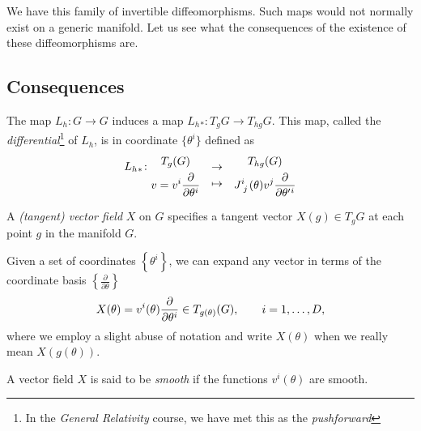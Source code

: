 We have this family of invertible diffeomorphisms. Such maps would not normally exist on a generic manifold. Let us see what the consequences of the existence of these diffeomorphisms are.

\subsection{Consequences}%
\label{sub:consequences}

\begin{wrapfigure}{R}{0.35\columnwidth}
  \centering
  \def\svgwidth{0.3\columnwidth}
  
  \label{fig:l8f2}
\end{wrapfigure}

The map $L_h \colon G \to G$ induces a map $L_h{}_*: T_g G \to T_{hg} G$.
This map, called the \emph{differential}\footnote{In the \emph{General Relativity} course, we have met this as the \emph{pushforward}} of $L_h$, is in coordinate $\{\theta^i\}$ defined as
\begin{equation}
  \begin{gathered}
    L_h{}_* \colon \\
    \qquad
  \end{gathered}
  \begin{gathered}
    T_g (G) \\
    v= v^{i} \frac{\partial }{\partial \theta^{i}}
  \end{gathered}
  \quad
  \begin{gathered}
    \to \\
    \mapsto
  \end{gathered}
  \quad
  \begin{gathered}
    T_{hg} (G) \\
    J\indices{^{i}_{j}}(\theta) v^{j} \frac{\partial }{\partial \theta'{}^{i}}
  \end{gathered}
\end{equation}

\begin{definition}[]
  A \emph{(tangent) vector field} $X$ on $G$ specifies a tangent vector $X(g) \in T_gG$ at each point $g$ in the manifold $G$.
\end{definition}
Given a set of coordinates $\left\{ \theta^{i} \right\}$, we can expand any vector in terms of the coordinate basis $\left\{ \frac{\partial }{\partial \theta} \right\}$ 
\begin{equation}
  X(\theta) = v^i(\theta) \pdv{}{\theta^i} \in T_{g(\theta)}(G), \qquad i = 1, \dots, D,
\end{equation}
where we employ a slight abuse of notation and write $X(\theta)$ when we really mean $X(g(\theta))$.
\begin{definition}[]
  A vector field $X$ is said to be \emph{smooth} if the functions $v^i(\theta)$ are smooth.
\end{definition}

